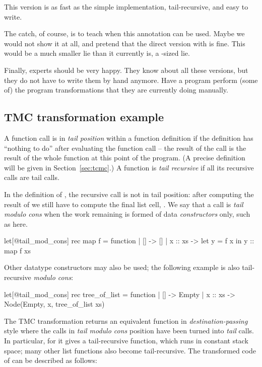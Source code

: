 This version is as fast as the simple implementation, tail-recursive,
and easy to write.

The catch, of course, is to teach when this 
annotation can be used. Maybe we would not show it at all, and pretend
that the direct  version with  is fine. This
would be a much smaller lie than it currently is,
a -sized lie.

Finally, experts should be very happy. They know about all these
versions, but they do not have to write them by hand anymore. Have
a program perform (some of) the program transformations that they are
currently doing manually.

\subsection{TMC transformation example}

A function call is in \emph{tail position} within a function
definition if the definition has ``nothing to do'' after evaluating
the function call -- the result of the call is the result of the whole
function at this point of the program. (A precise definition will be
given in Section~\ref{sec:tcmc}.) A function is \emph{tail recursive}
if all its recursive calls are tail calls.

In the definition of , the recursive call is not in tail
position: after computing the result of  we still have
to compute the final list cell, . We say that a call is
\emph{tail modulo cons} when the work remaining is formed of data
\emph{constructors} only, such as \ocaml{(::)} here.

\begin{Ocaml}
let[@tail_mod_cons] rec map f = function
| [] -> []
| x :: xs ->
  let y = f x in
  y :: map f xs
\end{Ocaml}

Other datatype constructors may also be used; the following example is
also tail-recursive \emph{modulo cons}:

\begin{Ocaml}
let[@tail_mod_cons] rec tree_of_list = function
| [] -> Empty
| x :: xs -> Node(Empty, x, tree_of_list xs)
\end{Ocaml}

The TMC transformation returns an equivalent function in
\emph{destination-passing} style where the calls in \emph{tail modulo
  cons} position have been turned into \emph{tail} calls. In
particular, for  it gives a tail-recursive function, which
runs in constant stack space; many other list functions also become
tail-recursive. The transformed code of  can be described as
follows:

